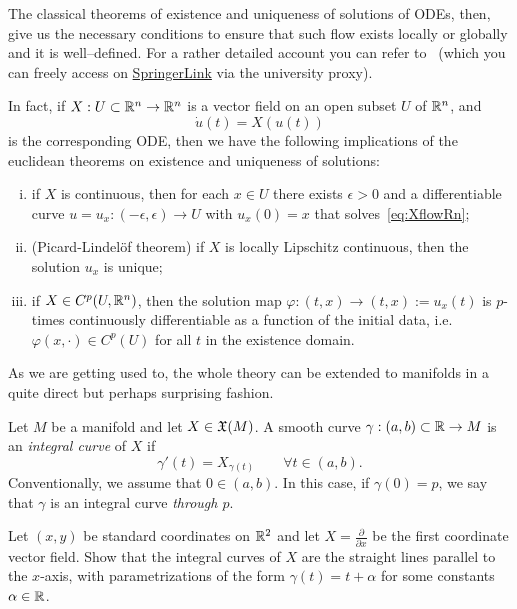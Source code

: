 The classical theorems of existence and uniqueness of solutions of ODEs, then, give us the necessary conditions to ensure that such flow exists locally or globally and it is well--defined.
For a rather detailed account you can refer to~\cite[Chapters 3.2 and 3.3]{book:knauf} (which you can freely access on \href{https://link.springer.com/book/10.1007\%2F978-3-662-55774-7}{SpringerLink} via the university proxy).

In fact, if $X: U\subset\mathbb{R}^n \to \mathbb{R}^n$ is a vector field on an open subset $U$ of $\mathbb{R}^n$, and
\begin{equation}\label{eq:XflowRn}
  \dot u(t) = X(u(t))
\end{equation}
is the corresponding ODE, then we have the following implications of the euclidean theorems on existence and uniqueness of solutions:
\begin{enumerate}[(i)]
  \item if $X$ is continuous, then for each $x\in U$ there exists $\epsilon > 0$ and a differentiable curve $u = u_{x} : (-\epsilon, \epsilon) \to U$ with $u_x(0) = x$ that solves~\eqref{eq:XflowRn};
  \item (Picard-Lindel\"of theorem) if $X$ is locally Lipschitz continuous, then the solution $u_x$ is unique;
  \item if $X\in C^p(U,\mathbb{R}^n)$, then the solution map $\varphi : (t, x) \to (t, x) := u_x (t)$ is $p$-times continuously differentiable as a function of the initial data, i.e. $\varphi(x, \cdot)\in C^p(U)$ for all $t$ in the existence domain.
\end{enumerate}

As we are getting used to, the whole theory can be extended to manifolds in a quite direct but perhaps surprising fashion.

\begin{definition}
  Let $M$ be a manifold and let $X\in\mathfrak{X}(M)$.
  A smooth curve $\gamma: (a,b)\subset\mathbb{R} \to M$ is an \emph{integral curve} of $X$ if
  \begin{equation}\label{eq:integralCurve}
    \gamma'(t) = X_{\gamma(t)} \qquad \forall t\in(a,b).
  \end{equation}
  Conventionally, we assume that $0\in(a,b)$. In this case, if $\gamma(0)=p$, we say that $\gamma$ is an integral curve \emph{through $p$}.
\end{definition}

\begin{exercise}
  Let $(x,y)$ be standard coordinates on $\mathbb{R}^2$ and let $X=\frac{\partial}{\partial x}$ be the first coordinate vector field.
  Show that the integral curves of $X$ are the straight lines parallel to the $x$-axis, with parametrizations of the form $\gamma(t) = t + \alpha$ for some constants $\alpha \in\mathbb{R}$.
\end{exercise}

